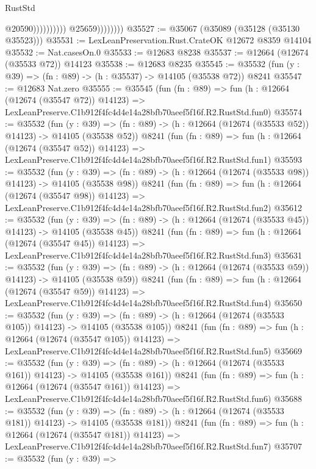 \begin{lexlean}{RustStd}
\begin{coremodule}
                                        @20590))))))))))
                    @25659))))))))
@35527 := @35067 (@35089 (@35128 (@35130 @35523)))
@35531 := LexLeanPreservation.Rust.CrateOK @12672 @8359 @14104
@35532 := Nat.casesOn.{0}
@35533 := @12683 @8238
@35537 := @12664 (@12674 (@35533 @72)) @14123
@35538 := @12683 @8235
@35545 := @35532 (fun (y : @39) => (fn : @89) -> (h : @35537) -> @14105 (@35538 @72)) @8241
@35547 := @12683 Nat.zero
@35555 := @35545
    (fun (fn : @89) =>
    fun (h : @12664 (@12674 (@35547 @72)) @14123) =>
    LexLeanPreserve.C1b912f4fc4d4e14a28bfb70aeef5f16f.R2.RustStd.fun0)
@35574 := @35532
    (fun (y : @39) =>
    (fn : @89) -> (h : @12664 (@12674 (@35533 @52)) @14123) -> @14105 (@35538 @52))
    @8241
    (fun (fn : @89) =>
    fun (h : @12664 (@12674 (@35547 @52)) @14123) =>
    LexLeanPreserve.C1b912f4fc4d4e14a28bfb70aeef5f16f.R2.RustStd.fun1)
@35593 := @35532
    (fun (y : @39) =>
    (fn : @89) -> (h : @12664 (@12674 (@35533 @98)) @14123) -> @14105 (@35538 @98))
    @8241
    (fun (fn : @89) =>
    fun (h : @12664 (@12674 (@35547 @98)) @14123) =>
    LexLeanPreserve.C1b912f4fc4d4e14a28bfb70aeef5f16f.R2.RustStd.fun2)
@35612 := @35532
    (fun (y : @39) =>
    (fn : @89) -> (h : @12664 (@12674 (@35533 @45)) @14123) -> @14105 (@35538 @45))
    @8241
    (fun (fn : @89) =>
    fun (h : @12664 (@12674 (@35547 @45)) @14123) =>
    LexLeanPreserve.C1b912f4fc4d4e14a28bfb70aeef5f16f.R2.RustStd.fun3)
@35631 := @35532
    (fun (y : @39) =>
    (fn : @89) -> (h : @12664 (@12674 (@35533 @59)) @14123) -> @14105 (@35538 @59))
    @8241
    (fun (fn : @89) =>
    fun (h : @12664 (@12674 (@35547 @59)) @14123) =>
    LexLeanPreserve.C1b912f4fc4d4e14a28bfb70aeef5f16f.R2.RustStd.fun4)
@35650 := @35532
    (fun (y : @39) =>
    (fn : @89) -> (h : @12664 (@12674 (@35533 @105)) @14123) -> @14105 (@35538 @105))
    @8241
    (fun (fn : @89) =>
    fun (h : @12664 (@12674 (@35547 @105)) @14123) =>
    LexLeanPreserve.C1b912f4fc4d4e14a28bfb70aeef5f16f.R2.RustStd.fun5)
@35669 := @35532
    (fun (y : @39) =>
    (fn : @89) -> (h : @12664 (@12674 (@35533 @161)) @14123) -> @14105 (@35538 @161))
    @8241
    (fun (fn : @89) =>
    fun (h : @12664 (@12674 (@35547 @161)) @14123) =>
    LexLeanPreserve.C1b912f4fc4d4e14a28bfb70aeef5f16f.R2.RustStd.fun6)
@35688 := @35532
    (fun (y : @39) =>
    (fn : @89) -> (h : @12664 (@12674 (@35533 @181)) @14123) -> @14105 (@35538 @181))
    @8241
    (fun (fn : @89) =>
    fun (h : @12664 (@12674 (@35547 @181)) @14123) =>
    LexLeanPreserve.C1b912f4fc4d4e14a28bfb70aeef5f16f.R2.RustStd.fun7)
@35707 := @35532
    (fun (y : @39) =>

\end{coremodule}
\end{lexlean}
